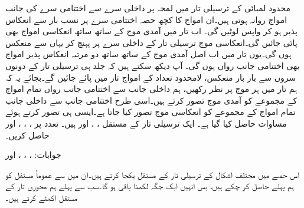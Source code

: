 محدود لمبائی کے ترسیلی تار میں لمحہ  پر داخلی سرے سے اختتامی سرے کی جانب  امواج روانہ ہوتی ہیں۔ان امواج کا کچھ حصہ اختتامی سرے پر نسب بار سے انعکاس پذیر ہو کر واپس لوٹیں گی۔ اب تار میں آمدی موج کے ساتھ ساتھ انعکاسی امواج بھی پائی جائیں گی۔انعکاسی موج ترسیلی تار کے داخلی سرے پر پہنچ کر یہاں سے منعکس ہوں گی۔یوں تار میں اب اصل آمدی موج کے ساتھ ساتھ دو مرتبہ انعکاس پذیر امواج بھی اختتامی جانب رواں ہوں گی۔ آپ دیکھ سکتے ہیں کہ جلد ہی ترسیلی تار کے دونوں سروں سے بار بار منعکس، لامحدود تعداد کے امواج تار میں پائے جائیں گے۔بجائے یہ کہ ہم تار میں ہر موج پر نظر رکھیں، ہم داخلی جانب سے اختتامی جانب رواں تمام امواج کے مجموعے کو آمدی موج تصور کرتے ہیں۔اسی طرح اختتامی جانب سے داخلی جانب تمام امواج کے مجموعے کو انعکاسی موج تصور کیا جاتا ہے۔ایسی ہی تصور کرتے ہوئے  مساوات  حاصل کیا گیا ہے۔  
ایک ترسیلی تار  کے مستقل ، ،  اور  ہیں۔ تعدد  پر ، ، ،  اور  حاصل کریں۔

جوابات: ، ، ،  اور 

اس حصے میں مختلف اشکال کے ترسیلی تار کے مستقل یکجا کرتے ہیں۔ان میں سے عموماً مستقل کو ہم پہلے حاصل کر چکے ہیں، بس انہیں ایک جگہ لکھنا باقی ہو گا۔سب سے پہلے ہم محوری تار کے مستقل اکھٹے کرتے ہیں۔

